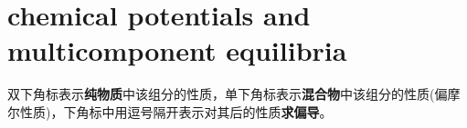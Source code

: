\ifx\allfiles\undefined
{}  %
\usepackage[dvipsnames]{xcolor}
\usepackage{amsmath}   %
\usepackage{graphicx}
\usetikzlibrary{arrows, calc, decorations.pathmorphing}
\allowdisplaybreaks %
\newcommand{\pa}{\partial}
\newcommand{\mathminus}{\!\!-\!\!} %
\newcommand{\vsup}[1]{\raisebox{-0.1ex}{$\scriptstyle #1$}}
\newcommand{\lsup}[1]{\raisebox{-0.85ex}{$\scriptstyle #1$}}



\else
\fi
\chapter{chemical potentials and multicomponent equilibria}
\begin{zhu}
    双下角标表示\textbf{纯物质}中该组分的性质，单下角标表示\textbf{混合物}中该组分的性质(偏摩尔性质)，下角标中用逗号隔开表示对其后的性质\textbf{求偏导}。
\end{zhu}
